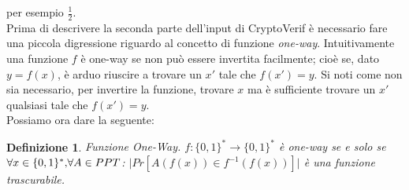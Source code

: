 \documentclass[a4paper,openright,twoside,12pt]{report}
\newtheorem{definizione}{Definizione}[chapter]
\begin{document}
per esempio $\frac{1}{2}$.
\\ 
Prima di descrivere la seconda parte dell'input di CryptoVerif \`e necessario fare una piccola digressione riguardo al concetto di funzione \emph{one-way}.
Intuitivamente una funzione $f$ \`e one-way se non pu\`o essere invertita facilmente; cio\`e se, dato $y=f(x)$, \`e arduo riuscire a trovare un $x'$ tale che $f(x')=y$. 
Si noti come non sia necessario, per invertire la funzione, trovare $x$ ma \`e sufficiente trovare un $x'$ qualsiasi tale che $f(x')=y$.
\\Possiamo ora dare la seguente:
\begin{definizione}{Funzione One-Way.}
$f: \{0,1\}^*\rightarrow \{0,1\}^*$ \`e one-way se e solo se $\forall x \in  \{0,1\}^* \hbox{,} \forall A \in PPT$:  $\lvert Pr[A(f(x)) \in f^{-1}(f(x))]\rvert$ \`e una funzione 
trascurabile.
\end{definizione}
\end{document}
